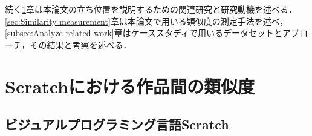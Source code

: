 \documentclass[T,J]{fose} %
\begin{document}
続く\ref{sec:RelatedWork}章は本論文の立ち位置を説明するための関連研究と研究動機を述べる．\ref{sec:Similarity measurement}章は本論文で用いる類似度の測定手法を述べ，\ref{subsec:Analyze related work}章はケーススタディで用いるデータセットとアプローチ，その結果と考察を述べる．

\section{Scratchにおける作品間の類似度}\label{sec:RelatedWork}

\subsection{ビジュアルプログラミング言語Scratch}\label{subsec:Scratch}
\end{document}
